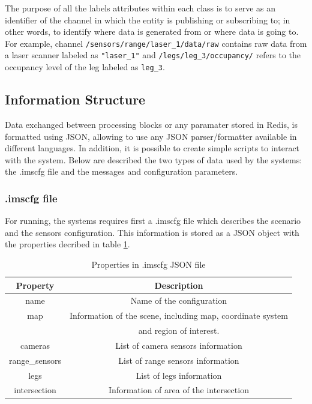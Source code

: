 The purpose of all the labels attributes within each class is to serve as an identifier of the channel in which the entity is publishing or subscribing to; in other words, to identify where data is generated from or where data is going to. For example, channel \texttt{/sensors/range/laser\_1/data/raw} contains raw data from a laser scanner labeled as \texttt{"laser\_1"} and \texttt{/legs/leg\_3/occupancy/} refers to the occupancy level of the leg labeled as \texttt{leg\_3}.

\subsection{Information Structure}


Data exchanged between processing blocks or any paramater stored in Redis, is formatted using JSON, allowing to use any JSON parser/formatter available in different languages. In addition,  it is possible to create simple scripts to interact with the system. Below are described the two types of data used by the systems: the .imscfg file and the messages and configuration parameters.

\subsubsection{.imscfg file}

For running, the systems requires first a .imscfg file which describes the scenario and the sensors configuration. This information is stored as a JSON object with the properties decribed in table \ref{imscfg_file}.

\begin{table}[ht!]
\footnotesize
\centering
\begin{tabular}{|c | c|}
\hline
\textbf{Property} & \textbf{Description} \\
\hline
name & Name of the configuration \\
\hline
map & Information of the scene, including map, coordinate system \\ 
 & and region of interest. \\
\hline
cameras & List of camera sensors information \\
\hline
range\_sensors & List of range sensors information \\
\hline
legs & List of legs information \\
\hline
intersection & Information of area of the intersection \\
\hline
\end{tabular}
\caption{Properties in .imscfg JSON file}
\label{imscfg_file}
\end{table}

